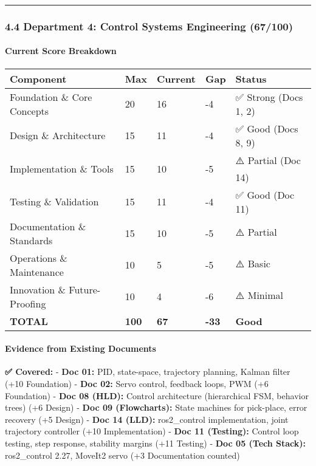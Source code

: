 \documentclass[
]{article}
\begin{document}
\begin{center}\rule{0.5\linewidth}{0.5pt}\end{center}

\hypertarget{department-4-control-systems-engineering-67100}{%
\subsubsection{4.4 Department 4: Control Systems Engineering
(67/100)}\label{department-4-control-systems-engineering-67100}}

\hypertarget{current-score-breakdown-3}{%
\paragraph{Current Score Breakdown}\label{current-score-breakdown-3}}

\begin{longtable}[]{@{}lllll@{}}
\toprule\noalign{}
Component & Max & Current & Gap & Status \\
\midrule\noalign{}
\endhead
\bottomrule\noalign{}
\endlastfoot
Foundation \& Core Concepts & 20 & 16 & -4 & ✅ Strong (Docs 1, 2) \\
Design \& Architecture & 15 & 11 & -4 & ✅ Good (Docs 8, 9) \\
Implementation \& Tools & 15 & 10 & -5 & ⚠️ Partial (Doc 14) \\
Testing \& Validation & 15 & 11 & -4 & ✅ Good (Doc 11) \\
Documentation \& Standards & 15 & 10 & -5 & ⚠️ Partial \\
Operations \& Maintenance & 10 & 5 & -5 & ⚠️ Basic \\
Innovation \& Future-Proofing & 10 & 4 & -6 & ⚠️ Minimal \\
\textbf{TOTAL} & \textbf{100} & \textbf{67} & \textbf{-33} &
\textbf{Good} \\
\end{longtable}

\hypertarget{evidence-from-existing-documents-3}{%
\paragraph{Evidence from Existing
Documents}\label{evidence-from-existing-documents-3}}

\textbf{✅ Covered:} - \textbf{Doc 01:} PID, state-space, trajectory
planning, Kalman filter (+10 Foundation) - \textbf{Doc 02:} Servo
control, feedback loops, PWM (+6 Foundation) - \textbf{Doc 08 (HLD):}
Control architecture (hierarchical FSM, behavior trees) (+6 Design) -
\textbf{Doc 09 (Flowcharts):} State machines for pick-place, error
recovery (+5 Design) - \textbf{Doc 14 (LLD):} ros2\_control
implementation, joint trajectory controller (+10 Implementation) -
\textbf{Doc 11 (Testing):} Control loop testing, step response,
stability margins (+11 Testing) - \textbf{Doc 05 (Tech Stack):}
ros2\_control 2.27, MoveIt2 servo (+3 Documentation counted)
\end{document}
